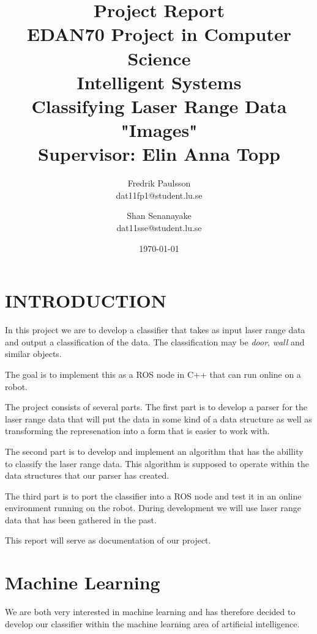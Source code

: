 \documentclass[a4paper, 10pt, conference]{ieeeconf}      %
\title{\LARGE \bf Project Report \\ EDAN70 Project in Computer Science \\ Intelligent Systems \\ Classifying Laser Range Data "Images" \\ Supervisor: Elin Anna Topp}
\date{\today}
\author{Fredrik Paulsson \\ dat11fp1@student.lu.se \and Shan Senanayake \\ dat11sse@student.lu.se}
\begin{document}
\maketitle
\thispagestyle{empty}
\pagestyle{empty}






\section{INTRODUCTION}

In this project we are to develop a classifier that takes as input laser range data and output a classification of the data. The classification may be \emph{door}, \emph{wall} and similar objects.

The goal is to implement this as a ROS node in C++ that can run online on a robot.

The project consists of several parts. The first part is to develop a parser for the laser range data that will put the data in some kind of a data structure as well as transforming the represenation into a form that is easier to work with.

The second part is to develop and implement an algorithm that has the abillity to classify the laser range data. This algorithm is supposed to operate within the data structures that our parser has created.

The third part is to port the classifier into a ROS node and test it in an online environment running on the robot. During development we will use laser range data that has been gathered in the past.

This report will serve as documentation of our project.

\section{Machine Learning}
We are both very interested in machine learning and has therefore decided to develop our classifier within the machine learning area of artificial intelligence.
\end{document}
